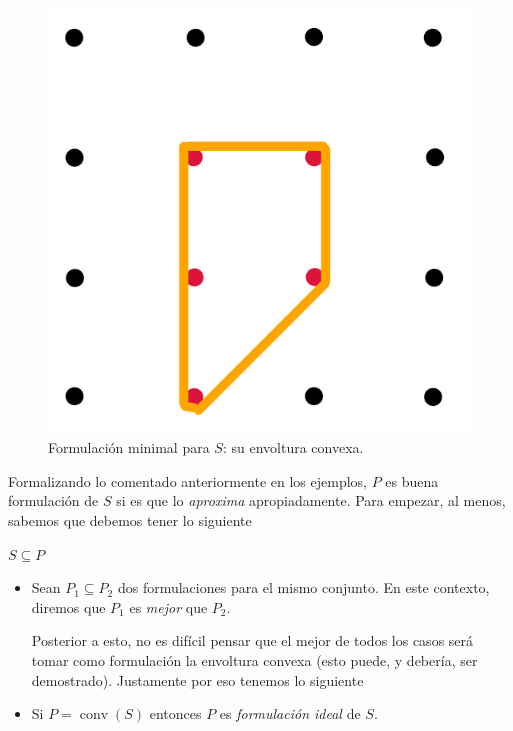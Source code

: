 \documentclass[10pt]{article}
\DeclareMathOperator{\conv}{conv}
\theoremstyle{plain}
\theoremstyle{definition}
\begin{document}
\begin{figure}[H] 
    \centering
    \includegraphics[scale=0.3]{formulacion3.png}
    \caption{Formulación minimal para $S$: su envoltura convexa.}
    \label{fig:formulacion3}
\end{figure}


Formalizando lo comentado anteriormente en los ejemplos, $P$ es buena formulación de $S$ si es que lo \emph{aproxima} apropiadamente. Para empezar, al menos, sabemos que debemos tener lo siguiente 
\begin{center}
$S\subseteq P$
\end{center}
\begin{itemize}

    \item Sean $P_1\subseteq P_2$ dos formulaciones para el mismo conjunto. En este contexto, diremos que $P_1$ es \emph{mejor} que $P_2$.
    
    Posterior a esto, no es difícil pensar que el mejor de todos los casos será tomar como formulación la envoltura convexa (esto puede, y debería, ser demostrado). Justamente por eso tenemos lo siguiente
    
    \item Si $P=\conv(S)$ entonces $P$ es \emph{formulación ideal} de $S$.
\end{itemize}
\end{document}
